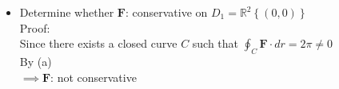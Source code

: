 \documentclass[../main.tex]{subfiles}
\begin{document}
\begin{enumerate}
\begin{itemize}
Proof:
\begin{align}
\bm{r}(t) &= (\cos(t),~\sin(t)), t\in [0,2\pi] \\
\implies \bm{r}'(t) &= (-\sin(t), \cos(t)) \\
\implies \bm{F}(\bm{r}(t) \cdot \bm{r}'(t) &=\left(
-\sin (t) \cos (t) 
\right)\cdot \left(
-\sin (t) \cos (t)
\right) \nonumber\\
&= \sin^2 t + \cos^2 t = 1
\end{align}
So:
\begin{equation}
\ointctrclockwise_C \bm{F} dr = \int_0^{2\pi} \bm{F}(\bm{r}(t)) \cdot \bm{r}'(t)dt = \int_0^{2\pi} 1 dt = 2\pi
\end{equation}
\item Determine whether $\bm{F}$: conservative on $D_1 = \mathbb{R}^2 \left\{(0,0)\right\}$\\
Proof:\\
Since there exists a closed curve $C$ such that $\oint_C \bm{F} \cdot dr = 2\pi \neq 0$\\
By (a) \\
$\implies \bm{F}$: not conservative
\end{itemize}
\end{enumerate}
\end{document}

